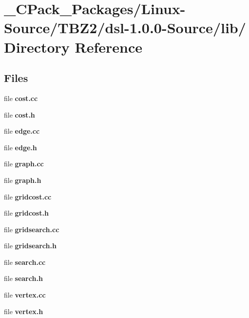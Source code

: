 \section{\_\-CPack\_\-Packages/Linux-\/Source/TBZ2/dsl-\/1.0.0-\/Source/lib/ Directory Reference}
\label{dir_64ce2f8fbfb9d6ded48e41ccdcb274a5}
\subsection*{Files}
\begin{DoxyCompactItemize}
\item 
file {\bf cost.cc}
\item 
file {\bf cost.h}
\item 
file {\bf edge.cc}
\item 
file {\bf edge.h}
\item 
file {\bf graph.cc}
\item 
file {\bf graph.h}
\item 
file {\bf gridcost.cc}
\item 
file {\bf gridcost.h}
\item 
file {\bf gridsearch.cc}
\item 
file {\bf gridsearch.h}
\item 
file {\bf search.cc}
\item 
file {\bf search.h}
\item 
file {\bf vertex.cc}
\item 
file {\bf vertex.h}
\end{DoxyCompactItemize}
